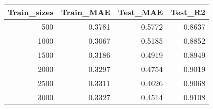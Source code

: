 \begin{tabular}{rrrr}
\toprule
Train_sizes & Train_MAE & Test_MAE & Test_R2 \\
\midrule
500 & 0.3781 & 0.5772 & 0.8637 \\
1000 & 0.3067 & 0.5185 & 0.8852 \\
1500 & 0.3186 & 0.4919 & 0.8949 \\
2000 & 0.3297 & 0.4754 & 0.9019 \\
2500 & 0.3311 & 0.4626 & 0.9068 \\
3000 & 0.3327 & 0.4514 & 0.9108 \\
\bottomrule
\end{tabular}

